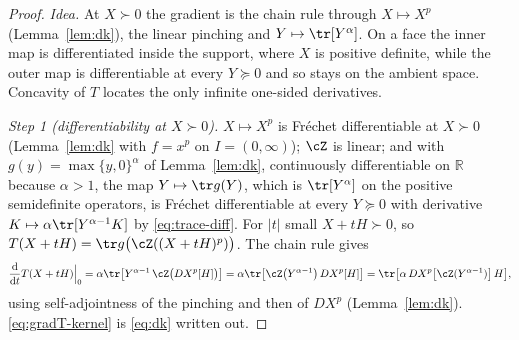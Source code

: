 \begin{proof}
\emph{Idea.} At $X\succ0$ the gradient is the chain rule through
$X\mapsto X^{p}$ (Lemma~\ref{lem:dk}), the linear pinching and
$Y\mapsto\tr[Y^{\alpha}]$. On a face the inner map is differentiated
inside the support, where $X$ is positive definite, while the outer map is
differentiable at every $Y\succeq0$ and so stays on the ambient space.
Concavity of $T$ locates the only infinite one-sided derivatives.

\emph{Step 1 (differentiability at $X\succ0$).} $X\mapsto X^{p}$ is
Fr\'echet differentiable at $X\succ0$ (Lemma~\ref{lem:dk} with
$f=x^{p}$ on $I=(0,\infty)$); $\cZ$ is linear; and with
$g(y)=\max\{y,0\}^{\alpha}$ of Lemma~\ref{lem:dk}, continuously
differentiable on $\mathbb{R}$ because $\alpha>1$, the map
$Y\mapsto\tr g(Y)$, which is $\tr[Y^{\alpha}]$ on the positive
semidefinite operators, is Fr\'echet differentiable at every $Y\succeq0$
with derivative $K\mapsto\alpha\tr[Y^{\alpha-1}K]$ by
\eqref{eq:trace-diff}. For $|t|$ small $X+tH\succ0$, so
$T(X+tH)=\tr g\big(\cZ((X+tH)^{p})\big)$. The chain rule gives
\begin{equation*}
  \frac{\mathrm d}{\mathrm dt}T(X+tH)\Big|_0
  =\alpha\tr\big[Y^{\alpha-1}\,\cZ\big(DX^{p}[H]\big)\big]
  =\alpha\tr\big[\cZ\big(Y^{\alpha-1}\big)\,DX^{p}[H]\big]
  =\tr\big[\alpha\,DX^{p}\big[\cZ(Y^{\alpha-1})\big]\,H\big],
\end{equation*}
using self-adjointness of the pinching and then of $DX^{p}$
(Lemma~\ref{lem:dk}). \eqref{eq:gradT-kernel} is \eqref{eq:dk} written
out.


\end{proof}
